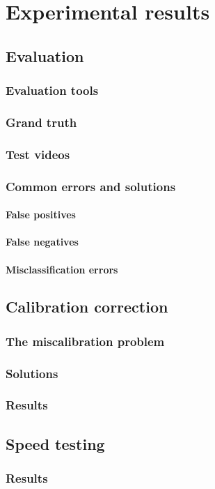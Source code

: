 \chapter{Experimental results}\label{chap:Tests}
\section{Evaluation}

\subsection{Evaluation tools}
\subsection{Grand truth}
\subsection{Test videos}

\subsection{Common errors and solutions}
\subsubsection{False positives}
\subsubsection{False negatives}
\subsubsection{Misclassification errors}

\section{Calibration correction}\label{chap:cal_corr}

\subsection{The miscalibration problem}
\subsection{Solutions}
\subsection{Results}

\section{Speed testing}

\subsection{Results}
